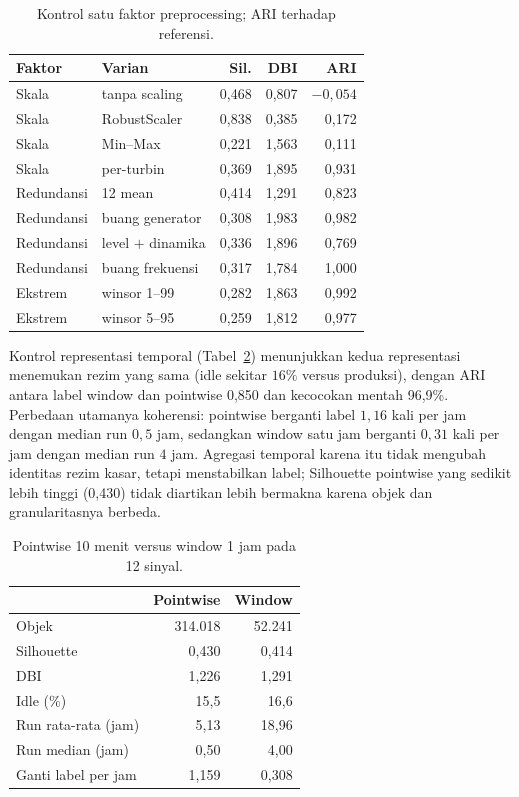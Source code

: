 \documentclass[conference]{IEEEtran}
\begin{document}
\begin{table}[H]
\centering
\caption{Kontrol satu faktor preprocessing; ARI terhadap referensi.}
\label{tab:rq1}
\footnotesize
\setlength{\tabcolsep}{4pt}
\begin{tabular}{llrrr}
\toprule
Faktor & Varian & Sil. & DBI & ARI \\
\midrule
Skala & tanpa scaling & 0,468 & 0,807 & $-0,054$ \\
Skala & RobustScaler & 0,838 & 0,385 & 0,172 \\
Skala & Min--Max & 0,221 & 1,563 & 0,111 \\
Skala & per-turbin & 0,369 & 1,895 & 0,931 \\
Redundansi & 12 mean & 0,414 & 1,291 & 0,823 \\
Redundansi & buang generator & 0,308 & 1,983 & 0,982 \\
Redundansi & level $+$ dinamika & 0,336 & 1,896 & 0,769 \\
Redundansi & buang frekuensi & 0,317 & 1,784 & 1,000 \\
Ekstrem & winsor 1--99 & 0,282 & 1,863 & 0,992 \\
Ekstrem & winsor 5--95 & 0,259 & 1,812 & 0,977 \\
\bottomrule
\end{tabular}
\end{table}

Kontrol representasi temporal (Tabel~\ref{tab:rq2}) menunjukkan kedua representasi menemukan rezim yang sama (idle sekitar $16\%$ versus produksi), dengan ARI antara label window dan pointwise 0,850 dan kecocokan mentah 96,9\%. Perbedaan utamanya koherensi: pointwise berganti label $1,16$ kali per jam dengan median run $0,5$ jam, sedangkan window satu jam berganti $0,31$ kali per jam dengan median run $4$ jam. Agregasi temporal karena itu tidak mengubah identitas rezim kasar, tetapi menstabilkan label; Silhouette pointwise yang sedikit lebih tinggi (0,430) tidak diartikan lebih bermakna karena objek dan granularitasnya berbeda.

\begin{table}[H]
\centering
\caption{Pointwise 10 menit versus window 1 jam pada 12 sinyal.}
\label{tab:rq2}
\footnotesize
\setlength{\tabcolsep}{4pt}
\begin{tabular}{lrr}
\toprule
 & Pointwise & Window \\
\midrule
Objek & 314.018 & 52.241 \\
Silhouette & 0,430 & 0,414 \\
DBI & 1,226 & 1,291 \\
Idle (\%) & 15,5 & 16,6 \\
Run rata-rata (jam) & 5,13 & 18,96 \\
Run median (jam) & 0,50 & 4,00 \\
Ganti label per jam & 1,159 & 0,308 \\
\bottomrule
\end{tabular}
\end{table}
\end{document}
